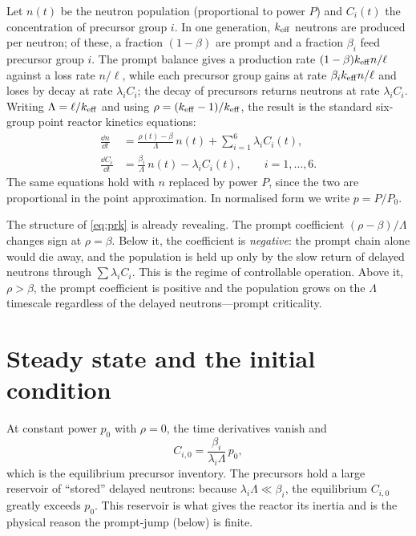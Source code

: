 Let $n(t)$ be the neutron population (proportional to power $P$) and $C_i(t)$ the
concentration of precursor group $i$. In one generation, $k_{\mathrm{eff}}$ neutrons are
produced per neutron; of these, a fraction $(1-\beta)$ are prompt and a fraction
$\beta_i$ feed precursor group $i$. The prompt balance gives a production rate
$(1-\beta)k_{\mathrm{eff}} n/\ell$ against a loss rate $n/\ell$, while each precursor group
gains at rate $\beta_i k_{\mathrm{eff}} n/\ell$ and loses by decay at rate $\lambda_i C_i$;
the decay of precursors returns neutrons at rate $\lambda_i C_i$. Writing
$\Lambda=\ell/k_{\mathrm{eff}}$ and using $\rho=(k_{\mathrm{eff}}-1)/k_{\mathrm{eff}}$, the result is the standard
six-group point reactor kinetics equations:
\begin{equation}
\boxed{\;
\begin{aligned}
\frac{\dd n}{\dd t}
  &= \frac{\rho(t)-\beta}{\Lambda}\, n(t) + \sum_{i=1}^{6}\lambda_i C_i(t),\\[4pt]
\frac{\dd C_i}{\dd t}
  &= \frac{\beta_i}{\Lambda}\, n(t) - \lambda_i C_i(t),
  \qquad i=1,\dots,6.
\end{aligned}\;}
\label{eq:prk}
\end{equation}
The same equations hold with $n$ replaced by power $P$, since the two are
proportional in the point approximation. In normalised form we write $p=P/P_0$.

The structure of \eqref{eq:prk} is already revealing. The prompt coefficient
$(\rho-\beta)/\Lambda$ changes sign at $\rho=\beta$. Below it, the coefficient is
\emph{negative}: the prompt chain alone would die away, and the population is held
up only by the slow return of delayed neutrons through $\sum\lambda_iC_i$. This
is the regime of controllable operation. Above it, $\rho>\beta$, the prompt
coefficient is positive and the population grows on the $\Lambda$ timescale
regardless of the delayed neutrons---prompt criticality.

\section{Steady state and the initial condition}

At constant power $p_0$ with $\rho=0$, the time derivatives vanish and
\begin{equation}
C_{i,0} = \frac{\beta_i}{\lambda_i\Lambda}\, p_0,
\label{eq:prk-ss}
\end{equation}
which is the equilibrium precursor inventory. The precursors hold a large reservoir
of ``stored'' delayed neutrons: because $\lambda_i\Lambda\ll\beta_i$, the
equilibrium $C_{i,0}$ greatly exceeds $p_0$. This reservoir is what gives the
reactor its inertia and is the physical reason the prompt-jump (below) is finite.

